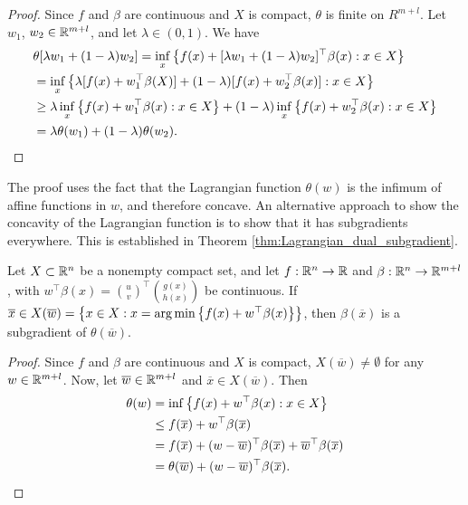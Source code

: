\begin{proof}
Since $f$ and $\beta$ are continuous and $X$ is compact, $\theta$ is finite on $R^{m+l}$. Let $w_1$, $w_2 \in \mathbb{R}^{m+l}$, and let $\lambda \in (0,1)$. We have
\begin{align*}
&\theta[\lambda w_1 + (1 - \lambda)w_2] = \inf_x\left\{ f(x) + [\lambda w_1 + (1 - \lambda)w_2]^\top \beta(x) : x \in X \right \}\\
& = \inf_x\left\{ \lambda[f(x) + w_1^\top\beta(X)] + (1-\lambda)[f(x) + w_2^\top \beta(x)] : x \in X \right \} \\
& \geq \lambda \inf_x\left\{ f(x) + w_1^\top \beta(x) : x \in X \right \} + (1 - \lambda)\inf_x\left\{ f(x) + w_2^\top \beta(x) : x \in X \right \} \\
&= \lambda \theta(w_1) + (1 - \lambda) \theta(w_2). \qedhere
\end{align*}
\end{proof}

The proof uses the fact that the Lagrangian function $\theta(w)$ is the infimum of affine functions in $w$, and therefore concave. An alternative approach to show the concavity of the Lagrangian function is to show that it has subgradients everywhere. This is established in Theorem \ref{thm:Lagrangian_dual_subgradient}. 

\begin{theorem} \label{thm:Lagrangian_dual_subgradient}
Let $X \subset \mathbb{R}^n$ be a nonempty compact set, and let $f: \mathbb{R}^n \to \mathbb{R}$ and $\beta : \mathbb{R}^{n} \to \mathbb{R}^{m+l}$, with $w^\top\beta(x) = \binom{u}{v}^\top \binom{g(x)}{h(x)}$ be continuous. If $\overline{x} \in X(\overline{w}) = \left\{ x \in X : x = \arg \min \left\{ f(x) + w^\top\beta(x) \right \} \right \}$, then $\beta(\overline{x})$ is a subgradient of $\theta(\overline{w})$.
\end{theorem}
%
\begin{proof}
Since $f$ and $\beta$ are continuous and $X$ is compact, $X(\overline{w}) \neq \emptyset$ for any $w \in \mathbb{R}^{m+l}$. Now, let $\overline{w} \in \mathbb{R}^{m+l}$ and $\overline{x} \in X(\overline{w})$. Then
\begin{align*}
\theta(w)& = \inf\left\{ f(x) + w^\top\beta(x) : x \in X \right \} \\ & \leq f(\overline{x}) + w^\top\beta(\overline{x}) \\ 
& = f(\overline{x}) + (w - \overline{w})^\top\beta(\overline{x}) + \overline{w}^\top \beta(\overline{x}) \\
& = \theta(\overline{w}) + (w - \overline{w})^\top \beta(\overline{x}). \qedhere
\end{align*}
\end{proof}

